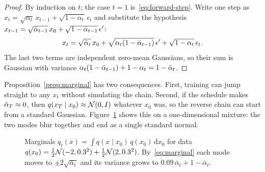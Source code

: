 \begin{proof}
By induction on $t$; the case $t = 1$ is~\eqref{eq:forward-step}.
Write one step as $x_t = \sqrt{\alpha_t}\,x_{t-1} + \sqrt{1-\alpha_t}\,\epsilon_t$ and substitute the hypothesis $x_{t-1} = \sqrt{\bar\alpha_{t-1}}\,x_0 + \sqrt{1-\bar\alpha_{t-1}}\,\epsilon'$:
\begin{equation*}
  x_t = \sqrt{\bar\alpha_t}\,x_0 + \sqrt{\alpha_t(1-\bar\alpha_{t-1})}\,\epsilon' + \sqrt{1-\alpha_t}\,\epsilon_t .
\end{equation*}
The last two terms are independent zero-mean Gaussians, so their sum is Gaussian with variance $\alpha_t(1-\bar\alpha_{t-1}) + 1 - \alpha_t = 1 - \bar\alpha_t$.
\end{proof}

Proposition~\ref{prop:marginal} has two consequences.
First, training can jump straight to any $x_t$ without simulating the chain.
Second, if the schedule makes $\bar\alpha_T \approx 0$, then $q(x_T \mid x_0) \approx \mathcal{N}(0, I)$ whatever $x_0$ was, so the reverse chain can start from a standard Gaussian.
Figure~\ref{fig:marginals} shows this on a one-dimensional mixture: the two modes blur together and end as a single standard normal.

\begin{figure}[t]
  \centering
  \caption{Marginals $q_t(x) = \int q(x \mid x_0)\,q(x_0)\,\mathrm{d}x_0$ for data $q(x_0) = \frac12\mathcal{N}(-2, 0.3^2) + \frac12\mathcal{N}(2, 0.3^2)$. By~\eqref{eq:marginal} each mode moves to $\pm 2\sqrt{\bar\alpha_t}$ and its variance grows to $0.09\,\bar\alpha_t + 1 - \bar\alpha_t$.}\label{fig:marginals}
\end{figure}

